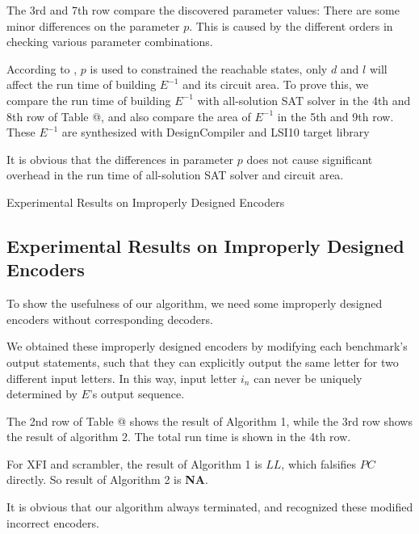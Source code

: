 \documentclass[journal]{IEEEtran}
\makeatletter
\newcommand{\Rmnum}[1]{\expandafter\@slowromancap\romannumeral #1@}
\makeatother
\begin{document}
The 3rd and 7th row compare the discovered parameter values:
There are some minor differences on the parameter $p$.
This is caused by the different orders in checking various parameter combinations.

According to \cite{ShengYuShen:tcad},
$p$ is used to constrained the reachable states,
only $d$ and $l$ will affect the run time of building $E^{-1}$ and its circuit area.
To prove this,
we compare the run time of building $E^{-1}$ with all-solution SAT solver in the 4th and 8th row of Table \Rmnum{2},
and also compare the area of $E^{-1}$ in the 5th and 9th row.
These $E^{-1}$ are synthesized with DesignCompiler and LSI10 target library


It is obvious that the differences in parameter $p$ does not cause significant overhead in the run time of all-solution SAT solver and circuit area.

\begin{table}[t]
\centering
\caption{Experimental Results on Improperly Designed Encoders}

\end{table}
\subsection{Experimental Results on Improperly Designed Encoders}
To show the usefulness of our algorithm,
we need some improperly designed encoders without corresponding decoders.

We obtained these improperly designed encoders by modifying each benchmark's output statements,
such that they can explicitly output the same letter for two different input letters.
In this way,
input letter $i_n$ can never be uniquely determined by $E$'s output sequence.

The 2nd row of Table \Rmnum{3} shows the result of Algorithm 1,
while the 3rd row shows the result of algorithm 2.
The total run time is shown in the 4th row.

For XFI and scrambler,
the result of Algorithm 1 is $LL$,
which falsifies $PC$ directly.
So result of Algorithm 2 is \textbf{NA}.

It is obvious that our algorithm always terminated,
and recognized these modified incorrect encoders.


%
%
%
%
\end{document}
